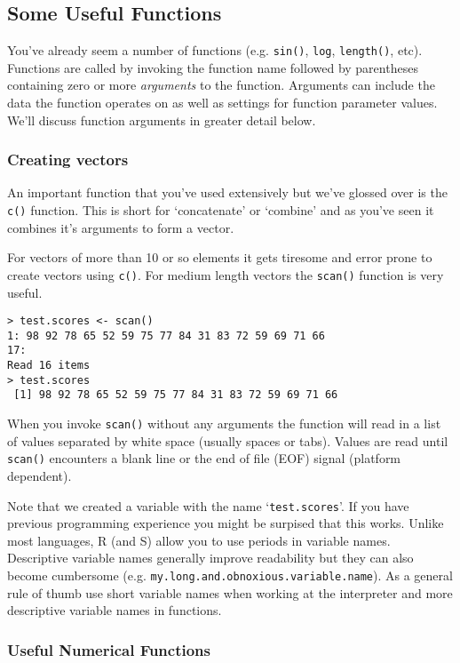 \subsection{Some Useful Functions}

You've already seem a number of functions (e.g. \lstinline!sin()!,
\lstinline!log!, \lstinline!length()!, etc). Functions are called by
invoking the function name followed by parentheses containing zero or
more \emph{arguments} to the function. Arguments can include the data
the function operates on as well as settings for function parameter
values. We'll discuss function arguments in greater detail below.

\subsubsection{Creating vectors}

An important function that you've used extensively but we've glossed
over is the \lstinline!c()! function. This is short for `concatenate' or
`combine' and as you've seen it combines it's arguments to form a
vector.

For vectors of more than 10 or so elements it gets tiresome and error
prone to create vectors using \lstinline!c()!. For medium length vectors
the \lstinline!scan()! function is very useful.

\begin{lstlisting}
> test.scores <- scan()
1: 98 92 78 65 52 59 75 77 84 31 83 72 59 69 71 66 
17: 
Read 16 items
> test.scores
 [1] 98 92 78 65 52 59 75 77 84 31 83 72 59 69 71 66
\end{lstlisting}
When you invoke \lstinline!scan()! without any arguments the function
will read in a list of values separated by white space (usually spaces
or tabs). Values are read until \lstinline!scan()! encounters a blank
line or the end of file (EOF) signal (platform dependent).

Note that we created a variable with the name `\lstinline!test.scores!'.
If you have previous programming experience you might be surpised that
this works. Unlike most languages, R (and S) allow you to use periods in
variable names. Descriptive variable names generally improve readability
but they can also become cumbersome (e.g.
\lstinline!my.long.and.obnoxious.variable.name!). As a general rule of
thumb use short variable names when working at the interpreter and more
descriptive variable names in functions.

\subsubsection{Useful Numerical Functions}

